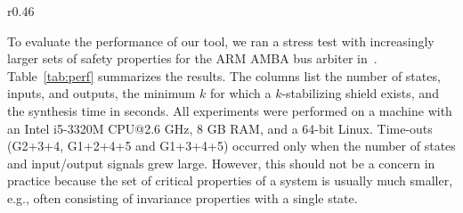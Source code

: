 \documentclass{llncs}
\begin{document}
\begin{wraptable}[10]{r}{0.46\textwidth}
\centering
\setlength{\tabcolsep}{5pt}
\vspace{-5ex}
\caption{Performance for AMBA~\cite{BloemJPPS12}.}
\vspace{-0.3cm}
\label{tab:perf}
\end{wraptable}
To evaluate the performance of our tool, we ran a stress test with 
increasingly larger sets of safety properties for the ARM AMBA bus 
arbiter in~\cite{BloemJPPS12}.  Table~\ref{tab:perf} summarizes the 
results.  The columns list the number of states, inputs, and outputs, 
the minimum $k$ for which a $k$-stabilizing shield exists, and the 
synthesis time in seconds.  All experiments were performed on a machine 
with an Intel i5-3320M CPU@2.6 GHz, 8 GB RAM, and a 64-bit Linux.  
Time-outs (G2+3+4, G1+2+4+5 and G1+3+4+5) occurred only when the number 
of states and input/output signals grew large.  However, this should not 
be a concern in practice because the set of critical properties of a 
system is usually much smaller, e.g., often consisting of invariance 
properties with a single state.  
\end{document}
